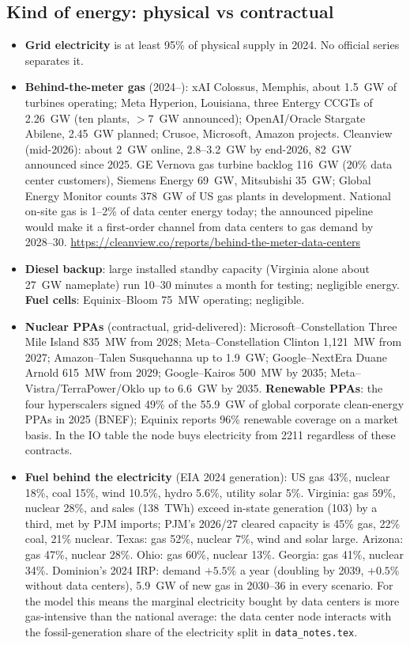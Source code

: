 \documentclass[11pt]{article}
\begin{document}
\subsection{Kind of energy: physical vs contractual}
\begin{itemize}
  \item \textbf{Grid electricity} is at least 95\% of physical supply in 2024. No official series separates it.
  \item \textbf{Behind-the-meter gas} (2024--): xAI Colossus, Memphis, about 1.5~GW of turbines operating; Meta Hyperion, Louisiana, three Entergy CCGTs of 2.26~GW (ten plants, $>7$~GW announced); OpenAI/Oracle Stargate Abilene, 2.45~GW planned; Crusoe, Microsoft, Amazon projects. Cleanview (mid-2026): about 2~GW online, 2.8--3.2~GW by end-2026, 82~GW announced since 2025. GE Vernova gas turbine backlog 116~GW (20\% data center customers), Siemens Energy 69~GW, Mitsubishi 35~GW; Global Energy Monitor counts 378~GW of US gas plants in development. National on-site gas is 1--2\% of data center energy today; the announced pipeline would make it a first-order channel from data centers to gas demand by 2028--30. \url{https://cleanview.co/reports/behind-the-meter-data-centers}
  \item \textbf{Diesel backup}: large installed standby capacity (Virginia alone about 27~GW nameplate) run 10--30 minutes a month for testing; negligible energy. \textbf{Fuel cells}: Equinix--Bloom 75~MW operating; negligible.
  \item \textbf{Nuclear PPAs} (contractual, grid-delivered): Microsoft--Constellation Three Mile Island 835~MW from 2028; Meta--Constellation Clinton 1{,}121~MW from 2027; Amazon--Talen Susquehanna up to 1.9~GW; Google--NextEra Duane Arnold 615~MW from 2029; Google--Kairos 500~MW by 2035; Meta--Vistra/TerraPower/Oklo up to 6.6~GW by 2035. \textbf{Renewable PPAs}: the four hyperscalers signed 49\% of the 55.9~GW of global corporate clean-energy PPAs in 2025 (BNEF); Equinix reports 96\% renewable coverage on a market basis. In the IO table the node buys electricity from 2211 regardless of these contracts.
  \item \textbf{Fuel behind the electricity} (EIA 2024 generation): US gas 43\%, nuclear 18\%, coal 15\%, wind 10.5\%, hydro 5.6\%, utility solar 5\%. Virginia: gas 59\%, nuclear 28\%, and sales (138~TWh) exceed in-state generation (103) by a third, met by PJM imports; PJM's 2026/27 cleared capacity is 45\% gas, 22\% coal, 21\% nuclear. Texas: gas 52\%, nuclear 7\%, wind and solar large. Arizona: gas 47\%, nuclear 28\%. Ohio: gas 60\%, nuclear 13\%. Georgia: gas 41\%, nuclear 34\%. Dominion's 2024 IRP: demand $+5.5\%$ a year (doubling by 2039, $+0.5\%$ without data centers), 5.9~GW of new gas in 2030--36 in every scenario. For the model this means the marginal electricity bought by data centers is more gas-intensive than the national average: the data center node interacts with the fossil-generation share of the electricity split in \texttt{data\_notes.tex}.
\end{itemize}
\end{document}
